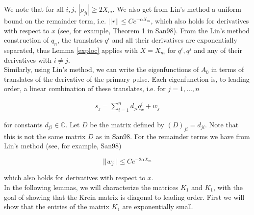 \documentclass[12pt]{article}
\def\C{{\mathbb C}}
\begin{document}
We note that for all $i, j$, $|\rho_{ji}| \geq 2 X_m$. We also get from Lin's method a uniform bound on the remainder term, i.e. $||r|| \leq C e^{-\alpha X_m}$, which also holds for derivatives with respect to $x$ (see, for example, Theorem 1 in San98). From the Lin's method construction of $q_n$, the translates $q^i$ and all their derivatives are exponentially separated, thus Lemma \ref{exploc} applies with $X = X_m$ for $q^i, q^j$ and any of their derivatives with $i \neq j$.\\

Similarly, using Lin's method, we can write the eigenfunctions of $A_0$ in terms of translates of the derivative of the primary pulse. Each eigenfunction is, to leading order, a linear combination of these translates, i.e. for $j = 1, \dots, n$

\begin{align}\label{sj}
s_j = \sum_{i = 1}^{n} d_{ji} q^i_x + w_j
\end{align}

for constants $d_{ji} \in \C$. Let $D$ be the matrix defined by $(D)_{ji} = d_{ji}$. Note that this is not the same matrix $D$ as in San98. For the remainder terms we have from Lin's method (see, for example, San98)

\begin{equation}\label{sjwbound}
||w_j|| \leq C e^{-2 \alpha X_m}
\end{equation}

which also holds for derivatives with respect to $x$. \\

In the following lemmas, we will characterize the matrices $K_1$ and $K_1$, with the goal of showing that the Krein matrix is diagonal to leading order. First we will show that the entries of the matrix $K_1$ are exponentially small.\\

\end{document}
